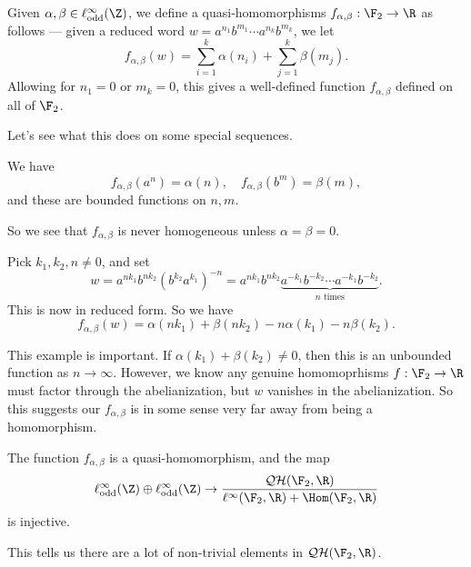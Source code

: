 \documentclass[a4paper]{article}
\newcommand\QH{\mathcal{QH}}
\begin{document}
Given $\alpha, \beta \in \ell_{\mathrm{odd}}^\infty(\Z)$, we define a quasi-homomorphisms $f_{\alpha, \beta} : \F_2 \to \R$ as follows --- given a reduced word $w = a^{n_1} b^{m_1} \cdots a^{n_k}b^{m_k}$, we let
\[
  f_{\alpha, \beta}(w) = \sum_{i= 1}^k \alpha(n_i) + \sum_{j = 1}^k \beta(m_j).
\]
Allowing for $n_1 = 0$ or $m_k = 0$, this gives a well-defined function $f_{\alpha,\beta}$ defined on all of $\F_2$.

Let's see what this does on some special sequences.
\begin{eg}
  We have
  \[
    f_{\alpha, \beta}(a^n) = \alpha(n),\quad f_{\alpha, \beta}(b^m) = \beta(m),
  \]
  and these are bounded functions on $n, m$.
\end{eg}
So we see that $f_{\alpha, \beta}$ is never homogeneous unless $\alpha = \beta = 0$.

\begin{eg}
  Pick $k_1, k_2, n \not= 0$, and set
  \[
    w = a^{nk_1} b^{nk_2} (b^{k_2}a^{k_1})^{-n} = a^{nk_1} b^{nk_2} \underbrace{a^{-k_1} b^{-k_2} \cdots a^{-k_1} b^{-k_2}}_{n\text{ times}}.
  \]
  This is now in reduced form. So we have
  \[
    f_{\alpha, \beta}(w) = \alpha(n k_1) + \beta (n k_2) - n \alpha(k_1) - n \beta(k_2).
  \]
\end{eg}
This example is important. If $\alpha(k_1) + \beta(k_2) \not= 0$, then this is an unbounded function as $n \to \infty$. However, we know any genuine homomoprhisms $f: \F_2 \to \R$ must factor through the abelianization, but $w$ vanishes in the abelianization. So this suggests our $f_{\alpha, \beta}$ is in some sense very far away from being a homomorphism.

\begin{thm}[P.\ Rolli, 2009]
  The function $f_{\alpha, \beta}$ is a quasi-homomorphism, and the map
  \[
    \ell^\infty_{\mathrm{odd}} (\Z) \oplus \ell^\infty_{\mathrm{odd}}(\Z) \to \frac{\QH(\F_2, \R)}{\ell^\infty(\F_2, \R) + \Hom(\F_2, \R)}
  \]
  is injective.
\end{thm}
This tells us there are a lot of non-trivial elements in $\QH(\F_2, \R)$.
\end{document}
